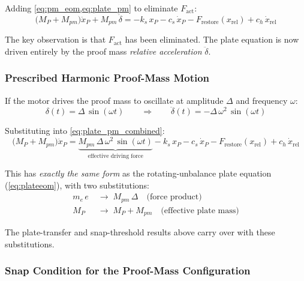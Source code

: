 \documentclass[11pt,letterpaper]{article}
\begin{document}
Adding \cref{eq:pm_eom,eq:plate_pm} to eliminate $F_{\mathrm{act}}$:
\begin{equation}
  \bigl(M_P + M_{pm}\bigr)\ddot{x}_P + M_{pm}\,\ddot{\delta}
  = -k_s\,x_P - c_s\,\dot{x}_P
    - F_{\mathrm{restore}}(x_{\mathrm{rel}}) + c_h\,\dot{x}_{\mathrm{rel}}
  \label{eq:plate_pm_combined}
\end{equation}

The key observation is that $F_{\mathrm{act}}$ has been eliminated.  The plate
equation is now driven entirely by the proof mass \emph{relative acceleration}
$\ddot{\delta}$.

\subsubsection{Prescribed Harmonic Proof-Mass Motion}

If the motor drives the proof mass to oscillate at amplitude $\Delta$ and
frequency $\omega$:
\begin{equation}
  \delta(t) = \Delta\,\sin(\omega t)
  \qquad\Longrightarrow\qquad
  \ddot{\delta}(t) = -\Delta\,\omega^2\,\sin(\omega t)
  \label{eq:pm_prescribed}
\end{equation}

Substituting into \cref{eq:plate_pm_combined}:
\begin{equation}
  \bigl(M_P + M_{pm}\bigr)\ddot{x}_P
  = \underbrace{M_{pm}\,\Delta\,\omega^2\,\sin(\omega t)}_{\text{effective driving force}}
    - k_s\,x_P - c_s\,\dot{x}_P
    - F_{\mathrm{restore}}(x_{\mathrm{rel}}) + c_h\,\dot{x}_{\mathrm{rel}}
  \label{eq:plate_pm_driven}
\end{equation}

This has \emph{exactly the same form} as the rotating-unbalance plate equation
(\cref{eq:plateeom}), with two substitutions:
\begin{align}
  m_e\,e   &\;\longrightarrow\; M_{pm}\,\Delta
    \quad\text{(force product)}
  \label{eq:pm_sub1}\\
  M_P      &\;\longrightarrow\; M_P + M_{pm}
    \quad\text{(effective plate mass)}
  \label{eq:pm_sub2}
\end{align}

The plate-transfer and snap-threshold results above carry over with these
substitutions.

\subsubsection{Snap Condition for the Proof-Mass Configuration}
\end{document}
